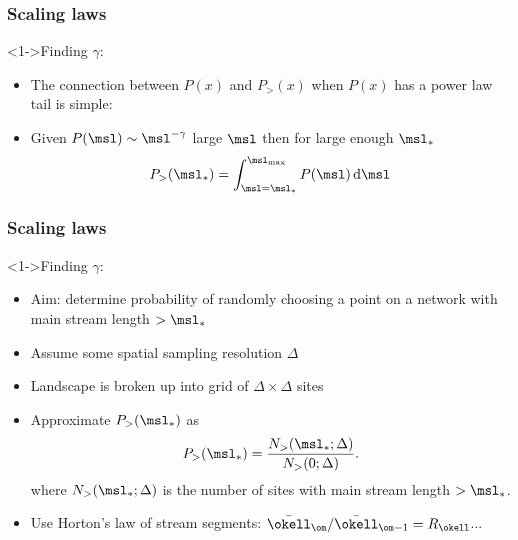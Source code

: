 \begin{frame}[label=]
  \frametitle{Scaling laws}

  \begin{block}<1->{Finding $\gamma$:}
    \begin{itemize}
      \item<1->
        The connection between $P(x)$ and $P_>(x)$ 
        when $P(x)$ has a power law tail is simple:
      \item<2->
        Given $P(\msl) \sim \msl^{-\gamma}$ large $\msl$ then
        for large enough $\msl_\ast$
        $$ 
        P_> (\msl_\ast) = 
        \int_{\msl=\msl_{\ast}}^{\msl_{\max}} P(\msl)\, {\textnormal{d}}{\msl}
        $$
    \end{itemize}
  \end{block}

\end{frame}

\begin{frame}[label=]
  \frametitle{Scaling laws}

  \begin{block}<1->{Finding $\gamma$:}
    \begin{itemize}
    \item<1-> \alert{Aim:} determine probability of randomly choosing
      a point on a network with main stream length $> \msl_\ast$
    \item<2-> Assume some spatial sampling resolution $\Delta$
    \item<3-> Landscape is broken up into grid of $\Delta \times \Delta$ sites
    \item<4-> Approximate $P_> (\msl_\ast)$ as 
      $$
      P_> (\msl_\ast)
      =
      \frac
      {N_> (\msl_\ast; \Delta)}
      {N_> (0; \Delta)}.
      $$
      where $N_> (\msl_\ast; \Delta)$ is the number of sites
      with main stream length $> \msl_\ast$.
    \item<5-> Use Horton's law of stream segments: $\bar{\okell}_\om/\bar{\okell}_{\om-1} = R_\okell$...
    \end{itemize}
  \end{block}

\end{frame}

